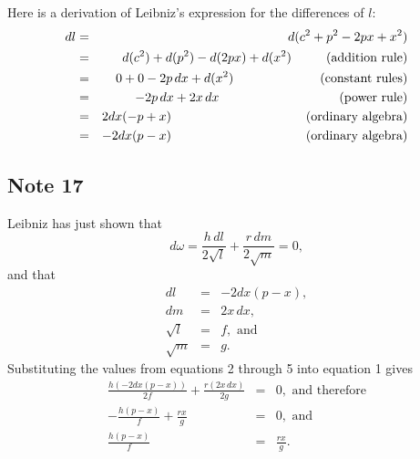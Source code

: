 \documentclass[twoside,openright]{article}
\begin{document}
Here is a derivation of Leibniz's expression for the differences of $l$:
\begin{eqnarray*}
dl & = & d(c^2 + p^2 - 2px + x^2) \\
& = & d(c^2) + d(p^2) -d(2px) + d(x^2) \mbox{\hspace{5.55ex} (addition rule)}\\
& = & 0 + 0 -2p\,dx + d(x^2) \mbox{\hspace{15ex} (constant rules)}\\
& = & -2p\,dx + 2x\,dx \mbox{\hspace{21.15ex} (power rule)}\\
& = & 2dx(-p + x) \mbox{\hspace{23.78ex} (ordinary algebra)}\\
& = & -2dx(p-x) \mbox{\hspace{23.78ex} (ordinary algebra)}
\end{eqnarray*}

\subsection*{Note 17}
\label{cnm17}

Leibniz has just shown that 
\begin{equation} d\omega =  \frac{h\,dl}{2\sqrt{l}} + \frac{r\,dm}{2\sqrt{m}}  =0,
\end{equation}
and that 
\begin{eqnarray}
dl & = & -2dx(p-x),\\
dm & = & 2x\,dx,\\
\sqrt{l} & = & f,\mbox{ and}\\
\sqrt{m} & = & g.
\end{eqnarray}
Substituting the values from equations 2 through 5 into equation 1 gives
\begin{eqnarray*}
\frac{h(-2dx(p-x))}{2f} + \frac{r(2x\,dx)}{2g} & = & 0,\mbox{ and therefore}\\
-\frac{h(p-x)}{f} + \frac{rx}{g} & = & 0, \mbox{ and}\\
\frac{h(p-x)}{f} & = & \frac{rx}{g}.
\end{eqnarray*}
 
\end{document}
